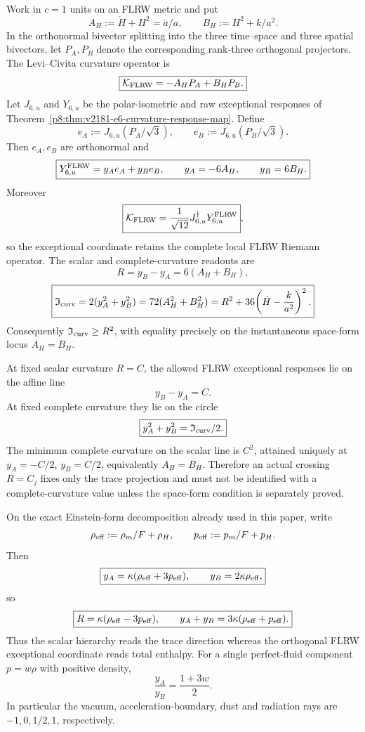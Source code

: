 \documentclass[12pt,a4paper]{article}
\begin{document}
\begin{theorem}
\label{p8:thm:v2185-flrw-e6-curvature-response}
Work in $c=1$ units on an FLRW metric and put
\[
 A_H:=\dot H+H^2=\ddot a/a,\qquad
 B_H:=H^2+k/a^2.
\]
In the orthonormal bivector splitting into the three time--space and three
spatial bivectors, let $P_A,P_B$ denote the corresponding rank-three
orthogonal projectors.  The Levi--Civita curvature operator is
\[
 \boxed{\mathcal K_{\rm FLRW}=-A_H P_A+B_H P_B.}
\]
Let $J_{6,u}$ and $Y_{6,u}$ be the polar-isometric and raw exceptional
responses of Theorem~\ref{p8:thm:v2181-e6-curvature-response-map}.  Define
\[
 e_A:=J_{6,u}(P_A/\sqrt3),\qquad
 e_B:=J_{6,u}(P_B/\sqrt3).
\]
Then $e_A,e_B$ are orthonormal and
\[
 \boxed{Y_{6,u}^{\rm FLRW}=y_Ae_A+y_Be_B,\qquad
 y_A=-6A_H,\qquad y_B=6B_H.}
\]
Moreover
\[
 \boxed{\mathcal K_{\rm FLRW}=\frac1{\sqrt{12}}J_{6,u}^\dagger Y_{6,u}^{\rm FLRW}},
\]
so the exceptional coordinate retains the complete local FLRW Riemann
operator.  The scalar and complete-curvature readouts are
\[
 \boxed{R=y_B-y_A=6(A_H+B_H)},
\]
\[
 \boxed{\mathfrak I_{\rm curv}=2(y_A^2+y_B^2)
 =72(A_H^2+B_H^2)
 =R^2+36\!\left(\dot H-\frac{k}{a^2}\right)^2.}
\]
Consequently $\mathfrak I_{\rm curv}\ge R^2$, with equality precisely on the
instantaneous space-form locus $A_H=B_H$.
\end{theorem}

\begin{corollary}
\label{p8:cor:v2185-flrw-e6-lines-circles}
At fixed scalar curvature $R=C$, the allowed FLRW exceptional responses lie
on the affine line
\[
 \boxed{y_B-y_A=C.}
\]
At fixed complete curvature they lie on the circle
\[
 \boxed{y_A^2+y_B^2=\mathfrak I_{\rm curv}/2.}
\]
The minimum complete curvature on the scalar line is $C^2$, attained uniquely
at $y_A=-C/2$, $y_B=C/2$, equivalently $A_H=B_H$.  Therefore an actual
crossing $R=C_j$ fixes only the trace projection and must not be identified
with a complete-curvature value unless the space-form condition is separately
proved.
\end{corollary}

\begin{corollary}
\label{p8:cor:v2185-flrw-e6-stress-coordinates}
On the exact Einstein-form decomposition already used in this paper, write
\[
 \rho_{\rm eff}:=\rho_m/F+\rho_H,\qquad
 p_{\rm eff}:=p_m/F+p_H.
\]
Then
\[
 \boxed{y_A=\kappa(\rho_{\rm eff}+3p_{\rm eff}),\qquad
 y_B=2\kappa\rho_{\rm eff},}
\]
so
\[
 \boxed{R=\kappa(\rho_{\rm eff}-3p_{\rm eff}),\qquad
 y_A+y_B=3\kappa(\rho_{\rm eff}+p_{\rm eff}).}
\]
Thus the scalar hierarchy reads the trace direction whereas the orthogonal
FLRW exceptional coordinate reads total enthalpy.  For a single perfect-fluid
component $p=w\rho$ with positive density,
\[
 \boxed{\frac{y_A}{y_B}=\frac{1+3w}{2}.}
\]
In particular the vacuum, acceleration-boundary, dust and radiation rays are
$-1,0,1/2,1$, respectively.
\end{corollary}
\end{document}
